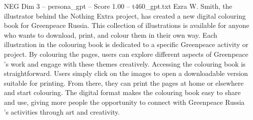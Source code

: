 \begin{textsample}{NEG Dim 3 – persona\_gpt – Score 1.00 – t460\_gpt.txt}  \label{ex:f3_neg_037}
Ezra W.
Smith, the illustrator behind the Nothing Extra project, has created a new digital colouring book for Greenpeace Russia.
This collection of illustrations is available for anyone who wants to download, print, and colour them in their own way.
Each illustration in the colouring book is dedicated to a specific Greenpeace activity or project.
By colouring the pages, users can explore different aspects of Greenpeace ’s work and engage with these themes creatively.
Accessing the colouring book is straightforward.
Users simply click on the images to open a downloadable version suitable for printing.
From there, they can print the pages at home or elsewhere and start colouring.
The digital format makes the colouring book easy to share and use, giving more people the opportunity to connect with Greenpeace Russia ’s activities through art and creativity.

\end{textsample}
